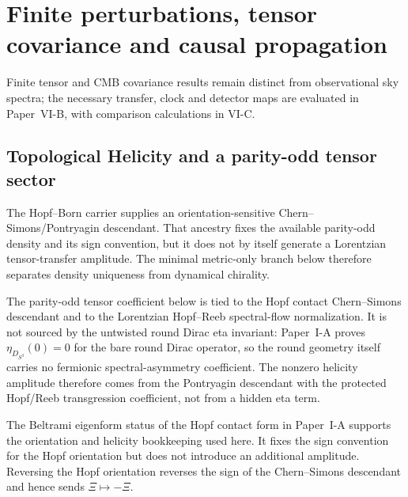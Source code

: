 \documentclass[12pt,a4paper]{article}
\begin{document}






\section{Finite perturbations, tensor covariance and causal propagation}
\label{p6a:sec:organized-a7}
Finite tensor and CMB covariance results remain distinct from observational sky spectra; the necessary transfer, clock and detector maps are evaluated in Paper~VI-B, with comparison calculations in VI-C.

\subsection{Topological Helicity and a parity-odd tensor sector}
\label{p8:subsec:topological-helicity-deferral}
The Hopf--Born carrier supplies an orientation-sensitive Chern--Simons/Pontryagin descendant.  That ancestry fixes the available parity-odd density and its sign convention, but it does not by itself generate a Lorentzian tensor-transfer amplitude.  The minimal metric-only branch below therefore separates density uniqueness from dynamical chirality.

\begin{remark}
\label{p8:rem:eta-zero-helicity-source-boundary}
The parity-odd tensor coefficient below is tied to the Hopf contact Chern--Simons descendant and to the Lorentzian Hopf--Reeb spectral-flow normalization.  It is not sourced by the untwisted round Dirac eta invariant: Paper~I-A proves \(\eta_{D_{S^3}}(0)=0\) for the bare round Dirac operator, so the round geometry itself carries no fermionic spectral-asymmetry coefficient.  The nonzero helicity amplitude therefore comes from the Pontryagin descendant with the protected Hopf/Reeb transgression coefficient, not from a hidden eta term.
\end{remark}

\begin{remark}
\label{p8:rem:beltrami-helicity-contact-only}
The Beltrami eigenform status of the Hopf contact form in Paper~I-A supports the orientation and helicity bookkeeping used here.  It fixes the sign convention for the Hopf orientation but does not introduce an additional amplitude.  Reversing the Hopf orientation reverses the sign of the Chern--Simons descendant and hence sends \(\Xi\mapsto-\Xi\).
\end{remark}
\end{document}
